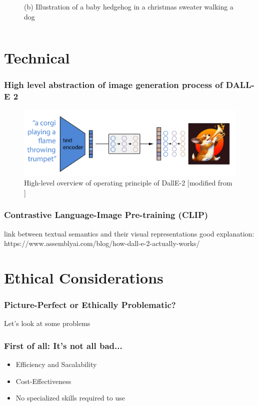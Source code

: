 \documentclass[
	11pt, compress%
]{beamer}
\begin{document}
\begin{frame}
\begin{columns}[c]
\begin{column}{0.5\textwidth}
\begin{figure}
				\caption{(b) Illustration of a baby hedgehog in a christmas sweater walking a dog \cite{DBLP:journals/corr/abs-2102-12092}} 
			\end{figure}
		\end{column}
	\end{columns}
\end{frame}


\section{Technical}

\begin{frame}
	\frametitle{High level abstraction of image generation process of DALL-E 2}
	\begin{figure}
		\includegraphics[width=0.85\linewidth]{Images/highLevel.png}
		\caption{High-level overview of operating principle of DallE-2 [modified from \cite{https://doi.org/10.48550/arxiv.2204.06125}]}
	\end{figure}
\end{frame}

\begin{frame}
	\frametitle{Contrastive Language-Image Pre-training (CLIP)}
	
	link between textual semantics and their visual representations
	good explanation: 
	https://www.assemblyai.com/blog/how-dall-e-2-actually-works/
\end{frame}


\section{Ethical Considerations}
\begin{frame}
\begin{center}
	\frametitle{Picture-Perfect or Ethically Problematic?}
	\huge Let's look at some problems
\end{center}
\end{frame}

\begin{frame}
	\frametitle{First of all: It's not all bad...}
	\begin{itemize}
		\setlength\itemsep{2em}
		\item Efficiency and Sacalability
		\item Cost-Effectiveness
		\item No specialized skills required to use
	\end{itemize}
\end{frame}
\end{document}
